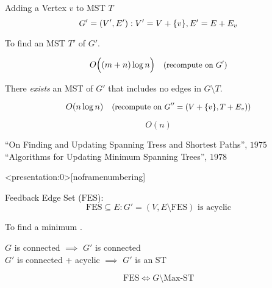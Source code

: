 
\begin{frame}{}
  \centerline{}
\end{frame}

\begin{frame}{}
  \begin{exampleblock}{Adding a Vertex $v$ to MST $T$ }
    \[
      G' = (V',E'): V' = V + \{v\}, E' = E + E_v
    \]

    \centerline{To find an MST $T'$ of $G'$.}
  \end{exampleblock}

  \pause
  \[
    O\Big((m+n) \log n\Big) \quad \text{\small (recompute on $G'$)}
  \]

  \pause
  \begin{theorem}
    \centerline{There \emph{exists} an MST of $G'$ that includes no edges in $G \setminus T$.}
  \end{theorem}
  \pause
  \[
    O(n \log n) \quad \text{\small (recompute on $G'' = (V + \{v\}, T + E_v)$)}
  \]


  \pause
  \[
    O(n)
  \]

  \pause
  \vspace{-0.30cm}
  \begin{center}
    {\small
      ``On Finding and Updating Spanning Tress and Shortest Paths'', $1975$ \\
      ``Algorithms for Updating Minimum Spanning Trees'', $1978$
    }
  \end{center}
\end{frame}

\begin{frame}<presentation:0>[noframenumbering]
  \begin{exampleblock}{Feedback Edge Set ($\text{FES}$): }
    \[
      \text{FES} \subseteq E: G' = (V, E \setminus \text{FES}) \text{ is acyclic}
    \]

    \centerline{To find a minimum .}
  \end{exampleblock}

  \pause
  \vspace{0.50cm}
  \begin{center}
    $G$ is connected $\implies$ $G'$ is connected \\[8pt]
    $G'$ is connected + acyclic $\implies$ $G'$ is an ST \\[8pt]
  \end{center}

  \pause
  \[
    \text{FES} \iff G \setminus \text{Max-ST}
  \]
\end{frame}

